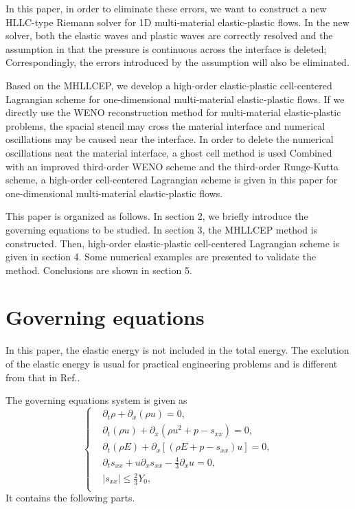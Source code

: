 \documentclass[review]{elsarticle}
\begin{document}
In this paper, in order to eliminate these errors,
 we want to construct a new HLLC-type Riemann solver for 1D multi-material elastic-plastic flows. In the new solver, both the elastic waves and plastic waves are correctly resolved and the assumption in \cite{cheng2016harten} that the pressure is continuous across the interface is deleted; Correspondingly, the errors introduced by the assumption will also be eliminated.

Based on the MHLLCEP, we develop a high-order elastic-plastic cell-centered Lagrangian scheme for one-dimensional multi-material elastic-plastic flows. If we directly use the WENO reconstruction method \cite{liu2018novel} for multi-material elastic-plastic problems,
the spacial stencil may cross the material interface
 and numerical oscillations may be caused near the interface. In order to delete the numerical oscillations neat the material interface, a ghost cell method is used
   Combined with an improved third-order WENO scheme\cite{liu2018novel} and the third-order Runge-Kutta scheme, a high-order cell-centered Lagrangian scheme is given in this paper for one-dimensional multi-material elastic-plastic flows.

This paper is organized as follows. In section 2, we briefly introduce the governing equations to be studied. In section 3, the MHLLCEP method is constructed.  Then, high-order elastic-plastic cell-centered Lagrangian scheme is given in section 4. Some numerical examples are presented to validate the method.  Conclusions are shown in section 5.

\section{Governing equations}
In this paper, the elastic energy is not included in the total energy. The exclution of the elastic energy is usual for practical engineering problems \cite{maire2013nominally} and is different from that in Ref.\cite{gavrilyuk2008modelling}.

The governing equations system is given as 
 \begin{equation}\label{eq:1d}
   \left\{ \begin{aligned}
       & \partial _t \rho +\partial_x(\rho u)=0,\\
       & \partial _t (\rho u)+\partial_x(\rho u^2 + p -s_{xx})=0,\\
       &\partial _t (\rho E)+\partial_x\left[(\rho E + p -s_{xx})u\right]=0,\\
       &\partial _t s_{xx}+u\partial_xs_{xx}-\frac{4}{3}\partial_x u=0,\\
& |s_{xx}|\leq \frac{2}{3}Y_{0}, \\
        \end{aligned}
  \right.
\end{equation}
It contains the following parts. 
\end{document}

